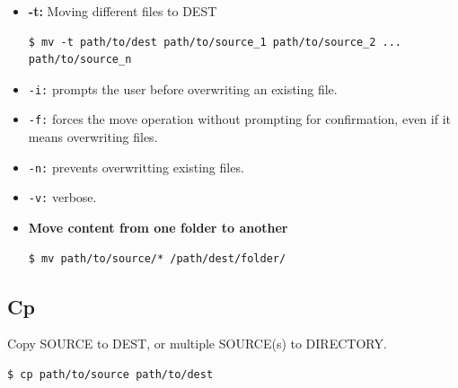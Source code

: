 \documentclass{article}
\newenvironment{codetemplate}[1][]{%
  \mybasecolorbox[#1]
  \itshape
}{%
  \endmybasecolorbox
}
\begin{document}
\begin{itemize}
    \item \textbf{-t:} Moving different files to DEST
\begin{codetemplate}{}
\begin{verbatim}
$ mv -t path/to/dest path/to/source_1 path/to/source_2 ... path/to/source_n
\end{verbatim}
\end{codetemplate}

    \item \verb|-i:| prompts the user before overwriting an existing file.
    \item \verb|-f:| forces the move operation without prompting for confirmation, even if it means overwriting files.
    \item \verb|-n:| prevents overwritting existing files.
    \item \verb|-v:| verbose.
    \item \textbf{Move content from one folder to another}
\begin{codetemplate}{}
\begin{verbatim}
$ mv path/to/source/* /path/dest/folder/
\end{verbatim}
\end{codetemplate}
\end{itemize}

\subsection{Cp}
Copy SOURCE to DEST, or multiple SOURCE(s) to DIRECTORY.

\begin{codetemplate}{}
\begin{verbatim}
$ cp path/to/source path/to/dest
\end{verbatim}
\end{codetemplate}
\end{document}
